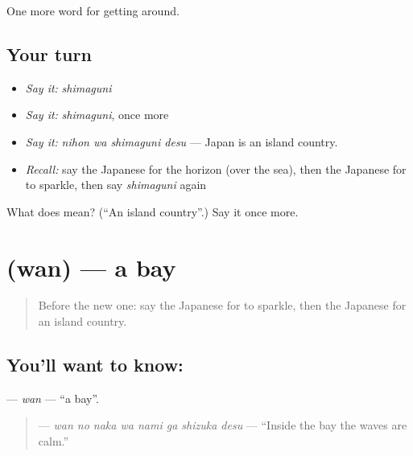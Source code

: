 \begin{grammarlens}[title={What you've built}]
One more word for getting around.
\end{grammarlens}

\subsection*{Your turn}
\begin{itemize}
\raggedright
  \item \emph{Say it:} \emph{shimaguni}
  \item \emph{Say it:} \emph{shimaguni}, once more
  \item \emph{Say it:} \emph{nihon wa shimaguni desu} — Japan is an island country.
  \item \emph{Recall:} say the Japanese for the horizon (over the sea), then the Japanese for to sparkle, then say \emph{shimaguni} again
\end{itemize}

\begin{tcolorbox}[breakable,colback=teal!4,colframe=teal!35!black,title={Before you move on}]
What does  mean? (\textquotedblleft{}An island country\textquotedblright{}.) Say it once more.
\end{tcolorbox}
\section[\texorpdfstring{\ja{わん} (wan)}{わん (wan)}]{ (wan) — a bay}

\label{lesson:JA-C383-wan}



\begin{quote}
Before the new one: say the Japanese for to sparkle, then the Japanese for an island country.
\end{quote}

\subsection*{You'll want to know: }
\textbf{} — \emph{wan} — \textquotedblleft{}a bay\textquotedblright{}.

\begin{quote}
\textbf{   } — \emph{wan no naka wa nami ga shizuka desu} — \textquotedblleft{}Inside the bay the waves are calm.\textquotedblright{}
\end{quote}

